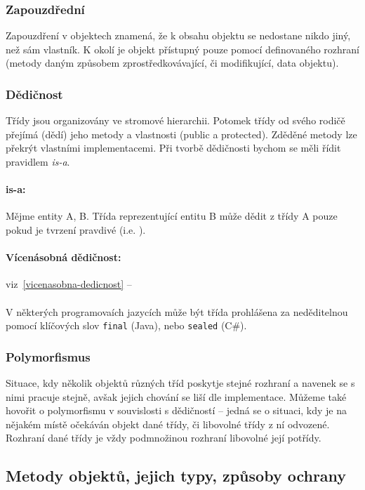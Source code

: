 \documentclass[10pt,a4paper]{article}
\begin{document}
		\subsubsection{Zapouzdřední}
		Zapouzdření v objektech znamená, že k obsahu objektu se nedostane nikdo jiný, než sám vlastník. K okolí je objekt přístupný pouze pomocí definovaného rozhraní (metody daným způsobem zprostředkovávající, či modifikující, data objektu).

		\subsubsection{Dědičnost}
		Třídy jsou organizovány ve stromové hierarchii. Potomek třídy od svého rodičě přejímá (dědí) jeho metody a vlastnosti (public a protected). Zděděné metody lze překrýt vlastními implementacemi. Při tvorbě dědičnosti bychom se měli řídit pravidlem \textit{is-a}.

		\paragraph{is-a:} Mějme entity A, B. Třída reprezentující entitu B může dědit z třídy A pouze pokud je tvrzení  pravdivé (i.e. ).

		\paragraph{Vícenásobná dědičnost:} viz~\ref{vicenasobna-dedicnost} -- 
		\\
		\\
		V některých programovaích jazycích může být třída prohlášena za neděditelnou pomocí klíčových slov \texttt{final} (Java), nebo \texttt{sealed} (C\#).

		\subsubsection{Polymorfismus}
		Situace, kdy několik objektů různých tříd poskytje stejné rozhraní a navenek se s nimi pracuje stejně, avšak jejich chování se liší dle implementace. Můžeme také hovořit o polymorfismu v souvislosti s dědičností -- jedná se o situaci, kdy je na nějakém místě očekáván objekt dané třídy, či libovolné třídy z ní odvozené. Rozhraní dané třídy je vždy podmnožinou rozhraní libovolné její potřídy.

	\subsection{Metody objektů, jejich typy, způsoby ochrany}
\end{document}
